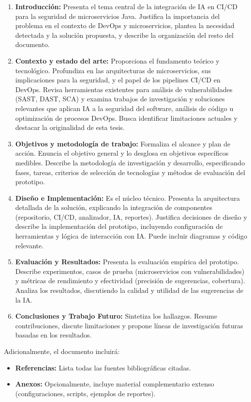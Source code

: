 \begin{enumerate}
\item \textbf{Introducción:} Presenta el tema central de la integración de IA en CI/CD para la seguridad de microservicios Java. Justifica la importancia del problema en el contexto de DevOps y microservicios, plantea la necesidad detectada y la solución propuesta, y describe la organización del resto del documento.

\item \textbf{Contexto y estado del arte:} Proporciona el fundamento teórico y tecnológico. Profundiza en las arquitecturas de microservicios, sus implicaciones para la seguridad, y el papel de los pipelines CI/CD en DevOps. Revisa herramientas existentes para análisis de vulnerabilidades (SAST, DAST, SCA) y examina trabajos de investigación y soluciones relevantes que aplican IA a la seguridad del software, análisis de código u optimización de procesos DevOps. Busca identificar limitaciones actuales y destacar la originalidad de esta tesis.

\item \textbf{Objetivos y metodología de trabajo:} Formaliza el alcance y plan de acción. Enuncia el objetivo general y lo desglosa en objetivos específicos medibles. Describe la metodología de investigación y desarrollo, especificando fases, tareas, criterios de selección de tecnologías y métodos de evaluación del prototipo.

\item \textbf{Diseño e Implementación:} Es el núcleo técnico. Presenta la arquitectura detallada de la solución, explicando la integración de componentes (repositorio, CI/CD, analizador, IA, reportes). Justifica decisiones de diseño y describe la implementación del prototipo, incluyendo configuración de herramientas y lógica de interacción con IA. Puede incluir diagramas y código relevante.

\item \textbf{Evaluación y Resultados:} Presenta la evaluación empírica del prototipo. Describe experimentos, casos de prueba (microservicios con vulnerabilidades) y métricas de rendimiento y efectividad (precisión de sugerencias, cobertura). Analiza los resultados, discutiendo la calidad y utilidad de las sugerencias de la IA.

\item \textbf{Conclusiones y Trabajo Futuro:} Sintetiza los hallazgos. Resume contribuciones, discute limitaciones y propone líneas de investigación futuras basadas en los resultados.
\end{enumerate}

Adicionalmente, el documento incluirá:

\begin{itemize}
\item \textbf{Referencias:}  Lista todas las fuentes bibliográficas citadas.
\item \textbf{Anexos:} Opcionalmente, incluye material complementario extenso (configuraciones, scripts, ejemplos de reportes).
\end{itemize}
